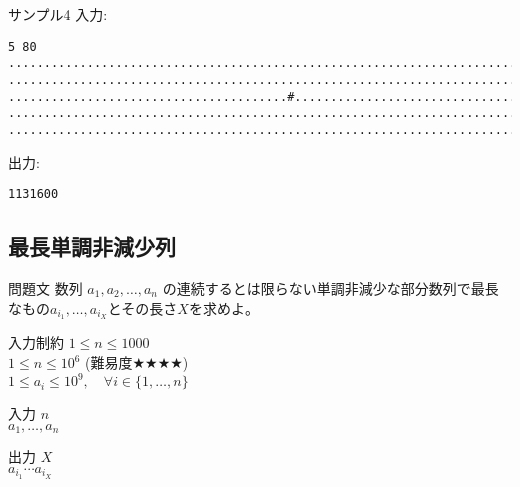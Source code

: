 \documentclass[a4paper,twoside,onecolumn,openany,article,10pt]{memoir}
\theoremstyle{remark}
\begin{document}
\begin{itembox}[l]{サンプル4}
入力:
\begin{verbatim}
5 80
................................................................................
................................................................................
.......................................#........................................
................................................................................
................................................................................
\end{verbatim}
出力:
\begin{verbatim}
1131600
\end{verbatim}
\end{itembox}


\clearpage

\subsection{最長単調非減少列}
\begin{itembox}[l]{問題文}
数列 $a_1, a_2,\dotsc, a_n$ の連続するとは限らない単調非減少な部分数列で最長なもの$a_{i_1}, \dotsc, a_{i_X}$とその長さ$X$を求めよ。
\end{itembox}

\begin{itembox}[l]{入力制約}
$1\le n\le 1000$\\
$1\le n\le 10^6$\hspace{2em} (難易度$\bigstar\bigstar\bigstar\bigstar$)\\
$1\le a_i\le 10^9,\quad\forall i\in\{1,\dotsc,n\}$
\end{itembox}

\begin{itembox}[l]{入力}
$n$\\
$a_1,\dotsc,a_n$
\end{itembox}

\begin{itembox}[l]{出力}
$X$\\
$a_{i_1} \dotsb a_{i_X}$
\end{itembox}
\end{document}
